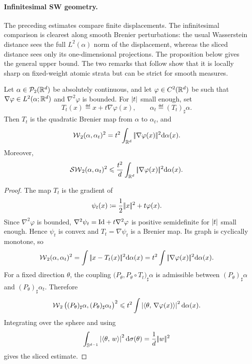 \paragraph{Infinitesimal SW geometry.}
The preceding estimates compare finite displacements. The infinitesimal
comparison is clearest along smooth Brenier perturbations: the usual
Wasserstein distance sees the full $L^2(\alpha)$ norm of the displacement,
whereas the sliced distance sees only its one-dimensional projections. The
proposition below gives the general upper bound. The two remarks that follow
show that it is locally sharp on fixed-weight atomic strata but can be strict
for smooth measures.

\begin{prop}\label{prop-sliced-first-order-tangent}
	Let $\alpha\in\mathcal{P}_2(\mathbb{R}^d)$ be absolutely continuous, and let $\varphi\in C^2(\mathbb{R}^d)$ be such that $\nabla\varphi\in L^2(\alpha;\mathbb{R}^d)$ and $\nabla^2\varphi$ is bounded. For $\left\lvert t\right\rvert$ small enough, set
	\[
		T_t(x)\eqdef x+t\nabla\varphi(x),
		\qquad
		\alpha_t\eqdef(T_t)_\sharp\alpha.
	\]
	Then $T_t$ is the quadratic Brenier map from $\alpha$ to $\alpha_t$, and
	\[
		\operatorname{\mathcal{W}}_2(\alpha,\alpha_t)^2
		=
		t^2\int_{\mathbb{R}^d}|\!| \nabla\varphi(x) |\!|^2\mathrm{d}\alpha(x).
	\]
	Moreover,
	\[
		\operatorname{\mathcal{SW}}_2(\alpha,\alpha_t)^2
		\leqslant
		\frac{t^2}{d}\int_{\mathbb{R}^d}|\!| \nabla\varphi(x) |\!|^2\mathrm{d}\alpha(x).
	\]
\end{prop}

\begin{proof}
	The map $T_t$ is the gradient of
	\[
		\psi_t(x)\coloneqq \frac12|\!| x |\!|^2+t\varphi(x).
	\]
	Since $\nabla^2\varphi$ is bounded, $\nabla^2\psi_t=\mathrm{Id}+t\nabla^2\varphi$ is positive semidefinite for $\left\lvert t\right\rvert$ small enough. Hence $\psi_t$ is convex and $T_t=\nabla\psi_t$ is a Brenier map. Its graph is cyclically monotone, so
	\[
		\operatorname{\mathcal{W}}_2(\alpha,\alpha_t)^2
		=
		\int|\!| x-T_t(x) |\!|^2\mathrm{d}\alpha(x)
		=
		t^2\int|\!| \nabla\varphi(x) |\!|^2\mathrm{d}\alpha(x).
	\]
	For a fixed direction $\theta$, the coupling
	\(\big(P_\theta,P_\theta\circ T_t\big)_\sharp\alpha\)
	is admissible between $(P_\theta)_\sharp\alpha$ and $(P_\theta)_\sharp\alpha_t$. Therefore
	\[
		\operatorname{\mathcal{W}}_2\big((P_\theta)_\sharp\alpha,(P_\theta)_\sharp\alpha_t\big)^2
		\leqslant
		t^2\int\left\lvert\langle \theta,\,\nabla\varphi(x)\rangle\right\rvert^2\mathrm{d}\alpha(x).
	\]
	Integrating over the sphere and using
	\[
		\int_{\mathbb{S}^{d-1}}\left\lvert\langle \theta,\,w\rangle\right\rvert^2\mathrm{d}\sigma(\theta)
		=
		\frac1d|\!| w |\!|^2
	\]
	gives the sliced estimate.
\end{proof}

